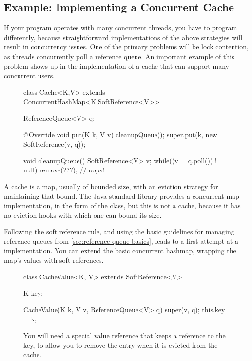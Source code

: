 \subsection{Example: Implementing a Concurrent Cache}
\label{sec:lifetime-management-concurrency-issues}

If your program operates with many concurrent threads, you have to program
differently, because straightforward implementations of the above strategies will
result in concurrency issues. One of the primary problems will be lock
contention, as threads concurrently poll a reference queue. An important example
of this problem shows up in the implementation of a cache that can support many
concurrent users.

\begin{wrapfigure}{r}{0.61\textwidth}
\centering
\begin{figurelisting}
class Cache<K,V> extends ConcurrentHashMap<K,SoftReference<V>> {
  ReferenceQueue<V> q;
   
  @Override
  void put(K k, V v) {
    cleanupQueue();
    super.put(k, new SoftReference(v, q));
  }
  
  void cleanupQueue() {
    SoftReference<V> v;
    while((v = q.poll()) != null) {
       remove(???); // oops!
    }
  }
}
\end{figurelisting}
\end{wrapfigure}

A cache is a map, usually of bounded size, with an eviction strategy for
maintaining that bound. The Java standard library provides a
concurrent map implementation, in the form of the 
class, but this is not a cache, because it has no eviction hooks with which one
can bound its size.

Following the soft reference rule, and using the basic guidelines for managing
reference queues from \autoref{sec:reference-queue-basics}, leads to a first
attempt at a  implementation. You can extend the basic
concurrent hashmap, wrapping the map's values with soft references.

\begin{wrapfigure}{r}{0.46\textwidth}
\centering
\begin{framedlisting}
class CacheValue<K, V> extends SoftReference<V> {
  K key;
   
  CacheValue(K k, V v, ReferenceQueue<V> q) {
    super(v, q);
    this.key = k;
  }
}
\end{framedlisting}
\caption{You will need a special value reference that keeps a reference to the
key, to allow you to remove the entry when it is evicted from the cache.}
\end{wrapfigure}

